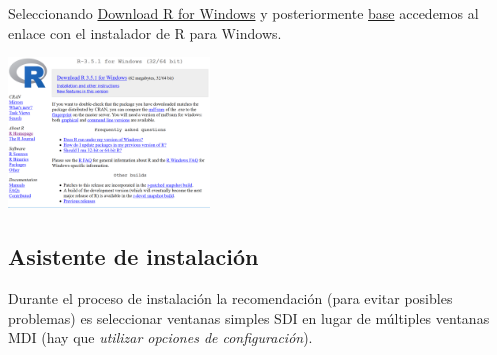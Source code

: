\documentclass[
]{book}
\begin{document}
Seleccionando \href{http://ftp.cixug.es/CRAN/bin/windows/}{Download R for Windows} y posteriormente
\href{http://ftp.cixug.es/CRAN/bin/windows/base/}{base} accedemos
al enlace con el instalador de R para Windows.

\includegraphics[width=0.4\textwidth,height=\textheight]{images/R351.png}

\hypertarget{asistente-de-instalaciuxf3n}{%
\subsection{Asistente de instalación}\label{asistente-de-instalaciuxf3n}}

Durante el proceso de instalación la recomendación (para evitar posibles problemas) es seleccionar ventanas simples SDI en lugar de múltiples ventanas MDI (hay que \emph{utilizar opciones de configuración}).
\end{document}
